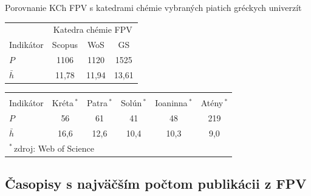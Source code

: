 \documentclass{beamer}
\begin{document}
%
%
\begin{frame}{Porovnanie KCh FPV s katedrami chémie vybraných piatich gréckych univerzít}
  \begin{table}
    \footnotesize
    \begin{tabular}{lccc}
    \toprule
    & \multicolumn{3}{c}{Katedra chémie FPV} \\
    \cmidrule{2-4}
    Indikátor & Scopus & WoS & GS \\
    \midrule
    $P$        & 1106   & 1120  & 1525  \\
    $\bar{h}$  & 11,78  & 11,94 & 13,61 \\
    \bottomrule
    \end{tabular}
  \end{table}
  \begin{table}
    \footnotesize
    \begin{tabular}{lccccc}
    \toprule
    & \multicolumn{5}{c}{\citet{Lazaridis2010}} \\
    \cmidrule{2-6}
    Indikátor & Kréta\,$^\ast$ & Patra\,$^\ast$ & Solún\,$^\ast$ & Ioaninna\,$^\ast$ & Atény\,$^\ast$ \\
    \midrule
    $P$        & 56    & 61    & 41    & 48   & 219 \\
    $\bar{h}$  & 16,6  & 12,6  & 10,4  & 10,3 & 9,0 \\
    \bottomrule
    \multicolumn{6}{l}{\tiny $^\ast$\,zdroj: Web of Science}
    \end{tabular}
  \end{table}
\end{frame}

\subsection{Časopisy s najväčším počtom publikácii z FPV}
\end{document}
